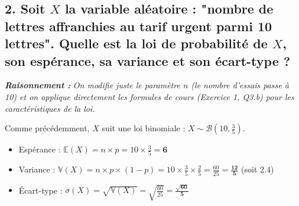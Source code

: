 \documentclass[11pt,a4paper]{article}
\newcommand{\explication}[1]{
    \vspace{0.2cm}
    \noindent\textcolor{blue!80!black}{
        \textbf{\textit{Raisonnement : }} \textit{#1}
    }
    \vspace{0.2cm}
}
\begin{document}
\subsection*{2. Soit $X$ la variable aléatoire : "nombre de lettres affranchies au tarif urgent parmi 10 lettres". Quelle est la loi de probabilité de $X$, son espérance, sa variance et son écart-type ?}

\explication{On modifie juste le paramètre $n$ (le nombre d'essais passe à 10) et on applique directement les formules de cours (Exercice 1, Q3.b) pour les caractéristiques de la loi.}

Comme précédemment, $X$ suit une loi binomiale : $X \sim \mathcal{B}\left(10, \frac{3}{5}\right)$.
\begin{itemize}
    \item Espérance : $\mathbb{E}(X) = n \times p = 10 \times \frac{3}{5} = \mathbf{6}$
    \item Variance : $\mathbb{V}(X) = n \times p \times (1-p) = 10 \times \frac{3}{5} \times \frac{2}{5} = \frac{60}{25} = \mathbf{\frac{12}{5}}$ (soit 2.4)
    \item Écart-type : $\sigma(X) = \sqrt{\mathbb{V}(X)} = \sqrt{\frac{60}{25}} = \mathbf{\frac{\sqrt{60}}{5}}$
\end{itemize}
\end{document}
